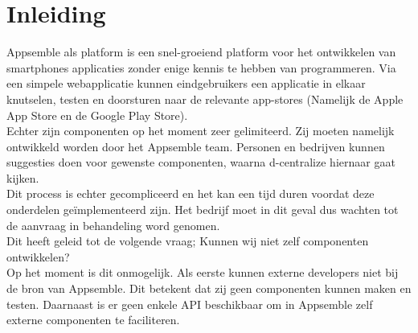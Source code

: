 \chapter{Inleiding}

Appsemble als platform is een snel-groeiend platform voor het ontwikkelen van smartphones applicaties zonder enige kennis te hebben van programmeren. Via een simpele webapplicatie kunnen eindgebruikers een applicatie in elkaar knutselen, testen en doorsturen naar de relevante app-stores (Namelijk de Apple App Store en de Google Play Store). \\

Echter zijn componenten op het moment zeer gelimiteerd. Zij moeten namelijk ontwikkeld worden door het Appsemble team. Personen en bedrijven kunnen suggesties doen voor gewenste componenten, waarna d-centralize hiernaar gaat kijken. \\

Dit process is echter gecompliceerd en het kan een tijd duren voordat deze onderdelen ge\"{i}mplementeerd zijn. Het bedrijf moet in dit geval dus wachten tot de aanvraag in behandeling word genomen. \\

Dit heeft geleid tot de volgende vraag; Kunnen wij niet zelf componenten ontwikkelen? \\

Op het moment is dit onmogelijk. Als eerste kunnen externe developers niet bij de bron van Appsemble. Dit betekent dat zij geen componenten kunnen maken en testen. Daarnaast is er geen enkele API beschikbaar om in Appsemble zelf externe componenten te faciliteren. \\
